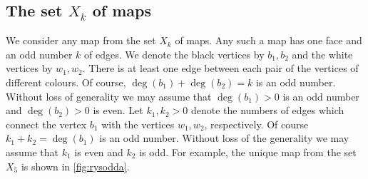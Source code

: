 \documentclass[submission]{FPSAC2021}
\DeclareMathOperator{\degg}{deg}
\newcommand{\nast}
{
	\sigma
}
\begin{document}
%
%
%
%
%
%

\subsection{The set $X_k$ of maps} 

We consider any map from the set $X_k$ of maps. Any such a
map has one face and an odd number $k$ of edges. We denote the black
vertices by $b_1, b_2$ and the white vertices by $w_1, w_2$. There is
at least one edge between each pair of the vertices of different colours.
Of course, $\degg(b_1)+\degg(b_2)=k$ is an odd number. Without loss of generality 
we may assume that $\degg(b_1)>0$ is an odd number and $\degg(b_2)>0$ is even.
Let $k_1, k_2 > 0$ denote the numbers of edges which connect
the vertex $b_1$ with the vertices $w_1, w_2$, respectively. 
Of course $k_1+k_2=\degg(b_1)$ is an odd number. Without loss of the generality 
we may assume that $k_1$ is
even and $k_2$ is odd. 
For example, the unique map from the
set $X_5$ is shown in \cref{fig:rysodda}.
\end{document}
